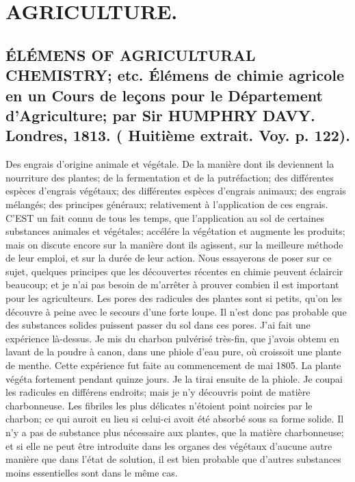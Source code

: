\setcounter{page}{145}
\chapter{AGRICULTURE.}
\section{ÉLÉMENS OF AGRICULTURAL CHEMISTRY; etc. Élémens de chimie agricole en un Cours de leçons pour le Département d'Agriculture; par Sir HUMPHRY DAVY. Londres, 1813. \large{( Huitième extrait. Voy. p. 122).}}
Des engrais d'origine animale et végétale. De la manière dont ils deviennent la nourriture des plantes; de la fermentation et de la putréfaction; des différentes espèces d'engrais végétaux; des différentes espèces d'engrais animaux; des engrais mélangés; des principes généraux; relativement à l'application de ces engrais.
C'EST un fait connu de tous les temps, que l'application au sol de certaines substances animales et végétales; accélére la végétation et augmente les produits; mais on discute encore sur la manière dont ils agissent, sur la meilleure méthode de leur emploi, et sur la durée de leur action. Nous\setcounter{page}{146} essayerons de poser sur ce sujet, quelques principes que les découvertes récentes en chimie peuvent éclaircir beaucoup; et je n'ai pas besoin de m'arrêter à prouver combien il est important pour les agriculteurs. Les pores des radicules des plantes sont si petits, qu'on les découvre à peine avec le secours d'une forte loupe. Il n'est donc pas probable que des substances solides puissent passer du sol dans ces pores. J'ai fait une expérience là-dessus. Je mis du charbon pulvérisé très-fin, que j'avois obtenu en lavant de la poudre à canon, dans une phiole d'eau pure, où croissoit une plante de menthe. Cette expérience fut faite au commencement de mai 1805. La plante végéta fortement pendant quinze jours. Je la tirai ensuite de la phiole. Je coupai les radicules en différens endroits; mais je n'y découvris point de matière charbonneuse. Les fibriles les plus délicates n'étoient point noircies par le charbon; ce qui auroit eu lieu si celui-ci avoit été absorbé sous sa forme solide. Il n'y a pas de substance plus nécessaire aux plantes, que la matière charbonneuse; et si elle ne peut être introduite dans les organes des végétaux d'aucune autre manière que dans l'état de solution, il est bien probable que d'autres substances moins essentielles sont dans le même cas.
